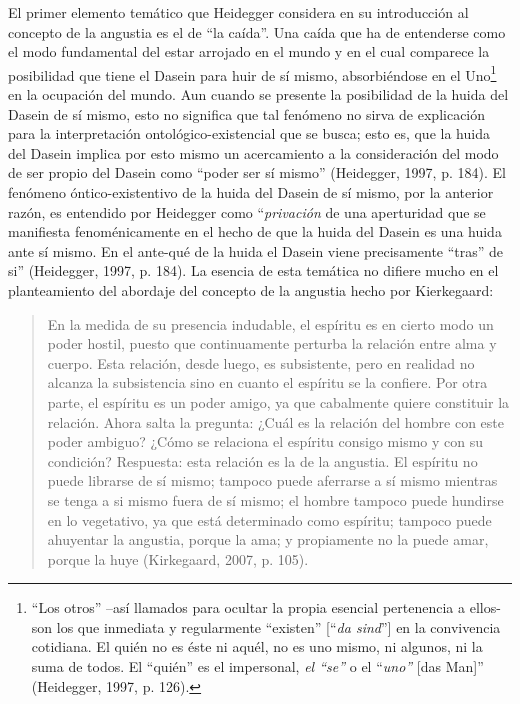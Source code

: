 \begin{refsection}
El primer elemento temático que Heidegger considera en su introducción al concepto de la angustia es el de ``la caída''. Una caída que ha de entenderse como el modo fundamental del estar arrojado en el mundo y en el cual comparece la posibilidad que tiene el Dasein para huir de sí mismo, absorbiéndose en el Uno\footnote{``Los otros'' --así llamados para ocultar la propia esencial pertenencia a ellos- son los que inmediata y regularmente ``existen'' {[}``\emph{da sind}''{]} en la convivencia cotidiana. El quién no es éste ni aquél, no es uno mismo, ni algunos, ni la suma de todos. El ``quién'' es el impersonal, \emph{el ``se''} o el ``\emph{uno''} {[}das Man{]}'' (Heidegger, 1997, p. 126).} en la ocupación del mundo. Aun cuando se presente la posibilidad de la huida del Dasein de sí mismo, esto no significa que tal fenómeno no sirva de explicación para la interpretación ontológico-existencial que se busca; esto es, que la huida del Dasein implica por esto mismo un acercamiento a la consideración del modo de ser propio del Dasein como ``poder ser sí mismo'' (Heidegger, 1997, p. 184). El fenómeno óntico-existentivo de la huida del Dasein de sí mismo, por la anterior razón, es entendido por Heidegger como ``\emph{privación} de una aperturidad que se manifiesta fenoménicamente en el hecho de que la huida del Dasein es una huida ante sí mismo. En el ante-qué de la huida el Dasein viene precisamente ``tras'' de si'' (Heidegger, 1997, p. 184). La esencia de esta temática no difiere mucho en el planteamiento del abordaje del concepto de la angustia hecho por Kierkegaard:

\begin{quote}
En la medida de su presencia indudable, el espíritu es en cierto modo un poder hostil, puesto que continuamente perturba la relación entre alma y cuerpo. Esta relación, desde luego, es subsistente, pero en realidad no alcanza la subsistencia sino en cuanto el espíritu se la confiere. Por otra parte, el espíritu es un poder amigo, ya que cabalmente quiere constituir la relación. Ahora salta la pregunta: ¿Cuál es la relación del hombre con este poder ambiguo? ¿Cómo se relaciona el espíritu consigo mismo y con su condición? Respuesta: esta relación es la de la angustia. El espíritu no puede librarse de sí mismo; tampoco puede aferrarse a sí mismo mientras se tenga a si mismo fuera de sí mismo; el hombre tampoco puede hundirse en lo vegetativo, ya que está determinado como espíritu; tampoco puede ahuyentar la angustia, porque la ama; y propiamente no la puede amar, porque la huye (Kirkegaard, 2007, p. 105).
\end{quote}


\end{refsection}

